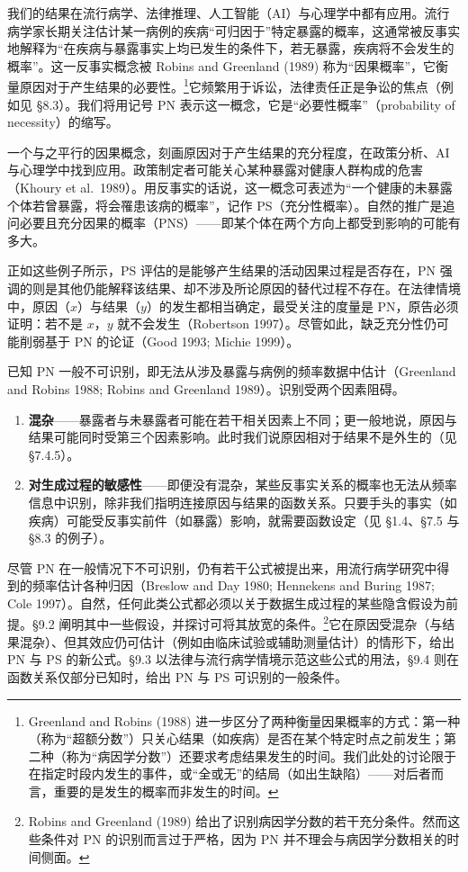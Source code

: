 我们的结果在流行病学、法律推理、人工智能（AI）与心理学中都有应用。流行病学家长期关注估计某一病例的疾病“可归因于”特定暴露的概率，这通常被反事实地解释为“在疾病与暴露事实上均已发生的条件下，若无暴露，疾病将不会发生的概率”。这一反事实概念被 Robins and Greenland (1989) 称为“因果概率”，它衡量原因对于产生结果的必要性。\footnote{Greenland and Robins (1988) 进一步区分了两种衡量因果概率的方式：第一种（称为“超额分数”）只关心结果（如疾病）是否在某个特定时点之前发生；第二种（称为“病因学分数”）还要求考虑结果发生的时间。我们此处的讨论限于在指定时段内发生的事件，或“全或无”的结局（如出生缺陷）——对后者而言，重要的是发生的概率而非发生的时间。}它频繁用于诉讼，法律责任正是争讼的焦点（例如见 \S 8.3）。我们将用记号 PN 表示这一概念，它是“必要性概率”（probability of necessity）的缩写。

一个与之平行的因果概念，刻画原因对于产生结果的充分程度，在政策分析、AI 与心理学中找到应用。政策制定者可能关心某种暴露对健康人群构成的危害（Khoury et al.\ 1989）。用反事实的话说，这一概念可表述为“一个健康的未暴露个体若曾暴露，将会罹患该病的概率”，记作 PS（充分性概率）。自然的推广是追问必要且充分因果的概率（PNS）——即某个体在两个方向上都受到影响的可能有多大。

正如这些例子所示，PS 评估的是能够产生结果的活动因果过程是否存在，PN 强调的则是其他仍能解释该结果、却不涉及所论原因的替代过程不存在。在法律情境中，原因（$x$）与结果（$y$）的发生都相当确定，最受关注的度量是 PN，原告必须证明：若不是 $x$，$y$ 就不会发生（Robertson 1997）。尽管如此，缺乏充分性仍可能削弱基于 PN 的论证（Good 1993; Michie 1999）。

已知 PN 一般不可识别，即无法从涉及暴露与病例的频率数据中估计（Greenland and Robins 1988; Robins and Greenland 1989）。识别受两个因素阻碍。

\begin{enumerate}[label=\arabic*.,leftmargin=1.8em]
\item \textbf{混杂}——暴露者与未暴露者可能在若干相关因素上不同；更一般地说，原因与结果可能同时受第三个因素影响。此时我们说原因相对于结果不是外生的（见 \S 7.4.5）。
\item \textbf{对生成过程的敏感性}——即便没有混杂，某些反事实关系的概率也无法从频率信息中识别，除非我们指明连接原因与结果的函数关系。只要手头的事实（如疾病）可能受反事实前件（如暴露）影响，就需要函数设定（见 \S 1.4、\S 7.5 与 \S 8.3 的例子）。
\end{enumerate}

尽管 PN 在一般情况下不可识别，仍有若干公式被提出来，用流行病学研究中得到的频率估计各种归因（Breslow and Day 1980; Hennekens and Buring 1987; Cole 1997）。自然，任何此类公式都必须以关于数据生成过程的某些隐含假设为前提。\S 9.2 阐明其中一些假设，并探讨可将其放宽的条件。\footnote{Robins and Greenland (1989) 给出了识别病因学分数的若干充分条件。然而这些条件对 PN 的识别而言过于严格，因为 PN 并不理会与病因学分数相关的时间侧面。}它在原因受混杂（与结果混杂）、但其效应仍可估计（例如由临床试验或辅助测量估计）的情形下，给出 PN 与 PS 的新公式。\S 9.3 以法律与流行病学情境示范这些公式的用法，\S 9.4 则在函数关系仅部分已知时，给出 PN 与 PS 可识别的一般条件。

